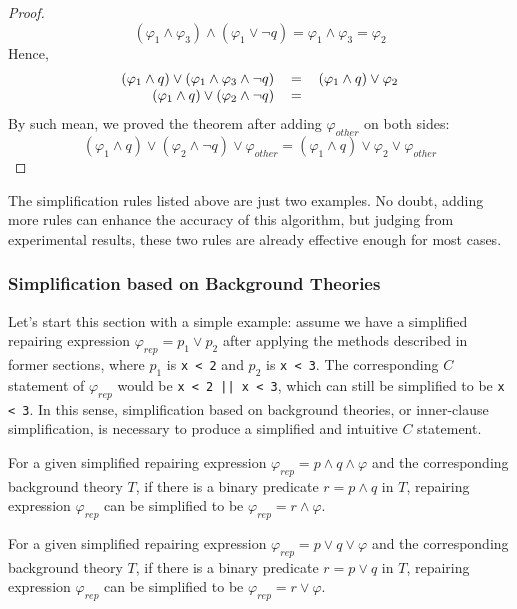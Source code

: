 \begin{proof}
\begin{equation}
(\varphi _{1} \wedge \varphi _{3}) \wedge (\varphi _{1} \vee \neg q) = \varphi _{1} \wedge \varphi _{3} = \varphi _{2}
\end{equation}
Hence,
\begin{equation}
\begin{tabular}{rcl}
$(\varphi _{1} \wedge q) \vee (\varphi _{1} \wedge \varphi _{3} \wedge \neg q)$&$=$&$(\varphi _{1} \wedge q) \vee \varphi _{2}$ \\
$(\varphi _{1} \wedge q) \vee (\varphi _{2} \wedge \neg q)$&$=$& \\
\end{tabular}
\end{equation}
By such mean, we proved the theorem after adding $\varphi _{other}$ on both sides:
\begin{equation}
(\varphi _{1} \wedge q) \vee (\varphi _{2} \wedge \neg q) \vee \varphi _{other} = (\varphi _{1} \wedge q) \vee \varphi _{2} \vee \varphi _{other}
\end{equation}
\end{proof}

The simplification rules listed above are just two examples.
No doubt, adding more rules can enhance the accuracy of this algorithm,
but judging from experimental results, these two rules are already effective enough for most cases.

\subsubsection{Simplification based on Background Theories}
Let's start this section with a simple example: assume we have a simplified repairing expression $\varphi _{rep} = p _{1} \vee p _{2}$ after applying the methods described in former sections,
where $p _{1}$ is \lstinline|x < 2| and $p _{2}$ is \lstinline|x < 3|. The corresponding $C$ statement of $\varphi _{rep}$ would be \lstinline{x < 2 || x < 3}, which can still be simplified to be \lstinline|x < 3|.
In this sense, simplification based on background theories, or inner-clause simplification, is necessary to produce a simplified and intuitive $C$ statement.

\begin{theorem}
\label{theorem:1}
For a given simplified repairing expression $\varphi _{rep} = p \wedge q \wedge \varphi$ and the corresponding background theory $T$, if there is a binary predicate $r = p \wedge q$ in $T$,
repairing expression $\varphi _{rep}$ can be simplified to be $\varphi _{rep} = r \wedge \varphi$.
\end{theorem}
\begin{theorem}
\label{theorem:2}
For a given simplified repairing expression $\varphi _{rep} = p \vee q \vee \varphi$ and the corresponding background theory $T$, if there is a binary predicate $r = p \vee q$ in $T$,
repairing expression $\varphi _{rep}$ can be simplified to be $\varphi _{rep} = r \vee \varphi$.
\end{theorem}

